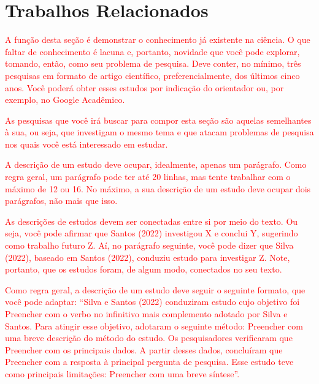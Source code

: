 \section{Trabalhos Relacionados}
\label{sec:trabalhos-re}


\textcolor{red}{A função desta seção é demonstrar o conhecimento já existente na ciência. O que faltar de conhecimento é lacuna e, portanto, novidade que você pode explorar, tomando, então, como seu problema de pesquisa. Deve conter, no mínimo, três pesquisas em formato de artigo científico, preferencialmente, dos últimos cinco anos. Você poderá obter esses estudos por indicação do orientador ou, por exemplo, no Google Acadêmico.}

\textcolor{red}{As pesquisas que você irá buscar para compor esta seção são aquelas semelhantes à sua, ou seja, que investigam o mesmo tema e que atacam problemas de pesquisa nos quais você está interessado em estudar.}

\textcolor{red}{A descrição de um estudo deve ocupar, idealmente, apenas um parágrafo. Como regra geral, um parágrafo pode ter até 20 linhas, mas tente trabalhar com o máximo de 12 ou 16. No máximo, a sua descrição de um estudo deve ocupar dois parágrafos, não mais que isso.}

\textcolor{red}{As descrições de estudos devem ser conectadas entre si por meio do texto. Ou seja, você pode afirmar que Santos (2022) investigou X e conclui Y, sugerindo como trabalho futuro Z. Aí, no parágrafo seguinte, você pode dizer que Silva (2022), baseado em Santos (2022), conduziu estudo para investigar Z. Note, portanto, que os estudos foram, de algum modo, conectados no seu texto.}

\textcolor{red}{Como regra geral, a descrição de um estudo deve seguir o seguinte formato, que você pode adaptar: “Silva e Santos (2022) conduziram estudo cujo objetivo foi {Preencher com o verbo no infinitivo mais complemento adotado por Silva e Santos}. Para atingir esse objetivo, adotaram o seguinte método: {Preencher com uma breve descrição do método do estudo}. Os pesquisadores verificaram que {Preencher com os principais dados}. A partir desses dados, concluíram que {Preencher com a resposta à principal pergunta de pesquisa}. Esse estudo teve como principais limitações: {Preencher com uma breve síntese}”.}

